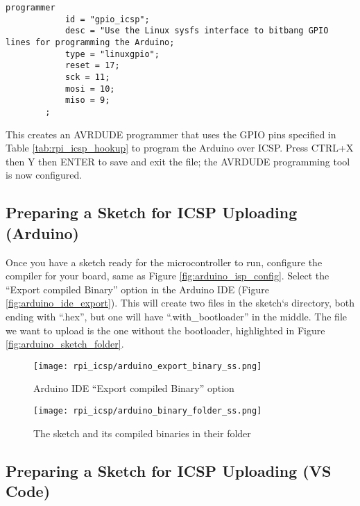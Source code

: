     \begin{lstlisting}[style=kaolstplain,linewidth=1.5\textwidth]
        programmer
            id = "gpio_icsp";
            desc = "Use the Linux sysfs interface to bitbang GPIO lines for programming the Arduino;
            type = "linuxgpio";
            reset = 17;
            sck = 11;
            mosi = 10;
            miso = 9;
        ;
    \end{lstlisting}

    This creates an AVRDUDE programmer that uses the GPIO pins specified in Table \ref{tab:rpi_icsp_hookup} to program the Arduino over ICSP. Press CTRL+X then Y then ENTER to save and exit the file; the AVRDUDE programming tool is now configured.

    \subsection*{Preparing a Sketch for ICSP Uploading (Arduino)}

    Once you have a sketch ready for the microcontroller to run, configure the compiler for your board, same as Figure \ref{fig:arduino_isp_config}.
    Select the ``Export compiled Binary'' option in the Arduino IDE (Figure \ref{fig:arduino_ide_export}). 
    This will create two files in the sketch`s directory, both ending with ``.hex'', but one will have ``.with\_bootloader'' in the middle. 
    The file we want to upload is the one without the bootloader, highlighted in Figure \ref{fig:arduino_sketch_folder}. \footnotemark
    
    
    \begin{figure}[h!]
        \texttt{[image: rpi\_icsp/arduino\_export\_binary\_ss.png]}
        \caption{Arduino IDE ``Export compiled Binary'' option}
    \end{figure}

    \begin{figure}[h!]
        \texttt{[image: rpi\_icsp/arduino\_binary\_folder\_ss.png]}
        \caption{The sketch and its compiled binaries in their folder}
    \end{figure}

    \subsection*{Preparing a Sketch for ICSP Uploading (VS Code)}

